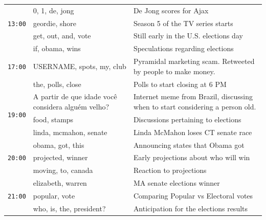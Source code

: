 \documentclass{sig-alternate}
\begin{document}
\begin{table}

\begin{center}
\small
\def\arraystretch{1.1}
\begin{tabular}{|p{.6cm}|p{2.5cm}|p{5cm}|}

\hline
\multirow{3}{*}{\texttt{13:00}} 	&  0, 1, de, jong 			& De Jong scores for Ajax \\ \cline{2-3} %
					   	& geordie, shore		& Season 5 of the TV series starts \\ \cline{2-3}
						& get, out, and, vote		& Still early in the U.S. elections day \\\hline

\multirow{3}{*}{\texttt{17:00}} 	&  if, obama, wins		& Speculations regarding elections \\ \cline{2-3}
					   	& USERNAME, spots, my, club		&  Pyramidal marketing scam. Retweeted by people to make money.  \\ \cline{2-3}
						& the, polls, close		& Polls to start closing at 6 PM \\\hline %

\multirow{3}{*}{\texttt{19:00}} 	&  A partir de que idade voc\^{e} considera algu\'{e}m velho?		& Internet meme from Brazil, discussing when to start considering a person old. \\ \cline{2-3}
					   	& food, stamps		& Discussions pertaining to elections \\ \cline{2-3}
						& linda, mcmahon, senate		&  Linda McMahon loses CT senate race \\\hline

\multirow{3}{*}{\texttt{20:00}} 	& obama, got, this		&  Announcing states that Obama got \\ \cline{2-3}
					   	& projected, winner		& Early projections about who will win \\ \cline{2-3}
						& moving, to, canada		&  Reaction to projections \\\hline


\multirow{3}{*}{\texttt{21:00}} 	& elizabeth, warren		&  MA senate elections winner \\ \cline{2-3}
					   	& popular, vote		& Comparing Popular vs Electoral votes \\ \cline{2-3}
						& who, is, the, president?		&  Anticipation for the elections results\\\hline
						


\end{tabular}
\end{center}
\end{table}
\end{document}
